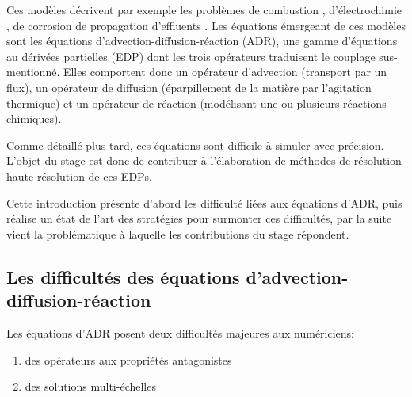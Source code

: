 Ces modèles décrivent par exemple les problèmes de combustion \cite{Law2006,Echekki2009}, d'électrochimie \cite{Munteanu2024SPM}, de corrosion \cite{AliasgharMamaghani2025}
de propagation d'effluents \cite{exemple_effluent}.
Les équations émergeant de ces modèles sont les équations d'advection-diffusion-réaction (ADR), 
une gamme d'équations au dérivées partielles (EDP) dont les trois opérateurs traduisent le couplage sus-mentionné.
Elles comportent donc un opérateur d'advection (transport par un flux), un opérateur de diffusion (éparpillement de la matière par l'agitation thermique) 
et un opérateur de réaction (modélisant une ou plusieurs réactions chimiques).\par 
Comme détaillé plus tard, ces équations sont difficile à simuler avec précision. L'objet du stage est donc de contribuer à l'élaboration
de méthodes de résolution haute-résolution de ces EDPs.\par 
Cette introduction présente d'abord les difficulté liées aux équations d'ADR, puis réalise un état de l'art des stratégies pour surmonter ces difficultés,
par la suite vient la problématique à laquelle les contributions du stage répondent.

\subsection{Les difficultés des équations d'advection-diffusion-réaction}
    Les équations d'ADR posent deux difficultés majeures aux numériciens:
    \begin{enumerate}[label=\Alph*.]
        \item des opérateurs aux propriétés antagonistes
        \item des solutions multi-échelles
    \end{enumerate}

